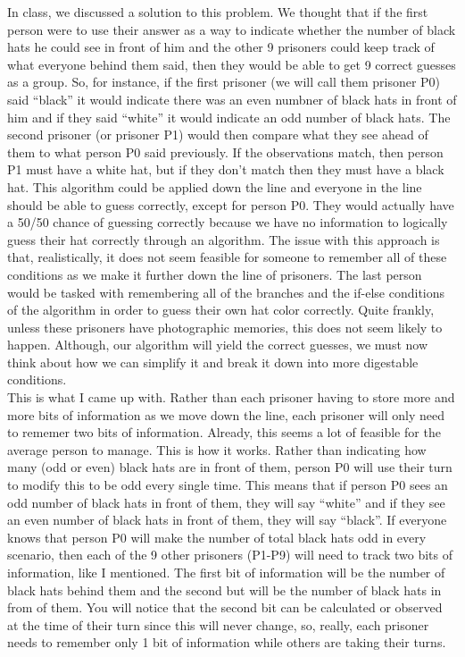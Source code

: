 \documentclass{article}
\theoremstyle{theorem}
\theoremstyle{definition}
\theoremstyle{remark}
\begin{document}
In class, we discussed a solution to this problem. We thought that if the first person were to use their answer as a way to indicate whether the number of black hats he could see in front of him and the other 9 prisoners could keep track of what everyone behind them said, then they would be able to get 9 correct guesses as a group. So, for instance, if the first prisoner (we 
will call them prisoner P0) said ``black'' it would indicate there was an even numbner of black hats in front of him and if they said ``white'' it would indicate an odd number of black hats. The second prisoner (or prisoner P1) would then compare what they see ahead of them to what person P0 said previously. If the observations match, then person P1 must have a white hat, but 
if they don't match then they must have a black hat. This algorithm could be applied down the line and everyone in the line should be able to guess correctly, except for person P0. They would actually have a 50/50 chance of guessing correctly because we have no information to logically guess their hat correctly through an algorithm. The issue with this approach is that, 
realistically, it does not seem feasible for someone to remember all of these conditions as we make it further down the line of prisoners. The last person would be tasked with remembering all of the branches and the if-else conditions of the algorithm in order to guess their own hat color correctly. Quite frankly, unless these prisoners have photographic memories, this does not 
seem likely to happen. Although, our algorithm will yield the correct guesses, we must now think about how we can simplify it and break it down into more digestable conditions. \\

This is what I came up with. Rather than each prisoner having to store more and more bits of information as we move down the line, each prisoner will only need to rememer two bits of information. Already, this seems a lot of feasible for the average person to manage. This is how it works. Rather than indicating how many (odd or even) black hats are in front of them, person P0 will use their 
turn to modify this to be odd every single time. This means that if person P0 sees an odd number of black hats in front of them, they will say ``white'' and if they see an even number of black hats in front of them, they will say ``black''. If everyone knows that person P0 will make the number of total black hats odd in every scenario, then each of the 9 other prisoners (P1-P9) will 
need to track two bits of information, like I mentioned. The first bit of information will be the number of black hats behind them and the second but will be the number of black hats in from of them. You will notice that the second bit can be calculated or observed at the time of their turn since this will never change, so, really, each prisoner needs to remember only 1 bit of information 
while others are taking their turns. \\
\end{document}
